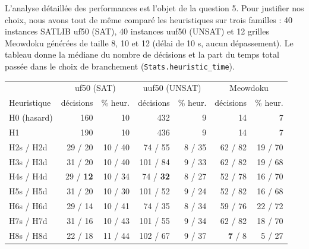 \documentclass[11pt,a4paper]{article}
\begin{document}
L'analyse détaillée des performances est l'objet de la question 5. Pour
justifier nos choix, nous avons tout de même comparé les heuristiques sur
trois familles : 40 instances SATLIB uf50 (SAT), 40 instances uuf50 (UNSAT)
et 12 grilles Meowdoku générées de taille 8, 10 et 12 (délai de 10 s,
aucun dépassement). Le tableau donne la médiane du nombre de décisions et
la part du temps total passée dans le choix de branchement
(\texttt{Stats.heuristic\_time}).
\begin{center}
\begin{tabular}{lrrrrrr}
  \toprule
  & \multicolumn{2}{c}{uf50 (SAT)} & \multicolumn{2}{c}{uuf50 (UNSAT)}
  & \multicolumn{2}{c}{Meowdoku} \\
  Heuristique & décisions & \% heur. & décisions & \% heur.
  & décisions & \% heur. \\
  \midrule
  H0 (hasard)  & 160 & 10 & 432 & 9 & 14 & 7 \\
  H1           & 190 & 10 & 436 & 9 & 14 & 7 \\
  H2s / H2d    & 29 / 20 & 10 / 40 & 74 / 55 & 8 / 35 & 62 / 82 & 19 / 70 \\
  H3s / H3d    & 31 / 20 & 10 / 40 & 101 / 84 & 9 / 33 & 62 / 82 & 19 / 68 \\
  H4s / H4d    & 29 / \textbf{12} & 10 / 34 & 74 / \textbf{32} & 8 / 27 & 52 / 78 & 16 / 70 \\
  H5s / H5d    & 31 / 20 & 10 / 30 & 101 / 52 & 9 / 24 & 52 / 82 & 16 / 68 \\
  H6s / H6d    & 29 / 14 & 10 / 41 & 74 / 35 & 8 / 34 & 59 / 76 & 22 / 72 \\
  H7s / H7d    & 31 / 16 & 10 / 43 & 101 / 55 & 9 / 34 & 62 / 82 & 18 / 70 \\
  H8s / H8d    & 22 / 18 & 11 / 44 & 102 / 67 & 9 / 37 & \textbf{7} / 8 & 5 / 27 \\
  \bottomrule
\end{tabular}
\end{center}
\end{document}
